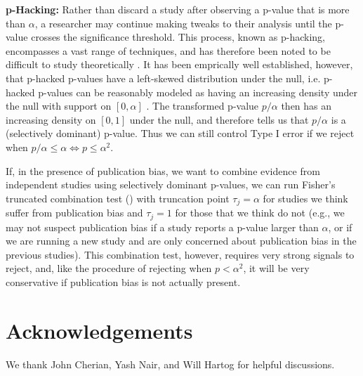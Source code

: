 \documentclass{article}
\begin{document}
\noindent \textbf{p-Hacking: } Rather than discard a study after observing a p-value that is more than $\alpha$, a researcher may continue making tweaks to their analysis until the p-value crosses the significance threshold. This process, known as p-hacking, encompasses a vast range of techniques, and has therefore been noted to be difficult to study theoretically \citep{Hung2020}. It has been emprically well established, however, that p-hacked p-values have a left-skewed distribution under the null, i.e. p-hacked p-values can be reasonably modeled as having an increasing density under the null with support on $[0,\alpha]$ \citep{Simonsohn, Hung2020}. The transformed p-value $p/\alpha$ then has an increasing density on $[0, 1]$ under the null, and  therefore tells us that $p/\alpha$ is a (selectively dominant) p-value. Thus we can still control Type I error if we reject when $p/\alpha \leq \alpha \iff p \leq \alpha^2$. \newline  

If, in the presence of publication bias, we want to combine evidence from independent studies using selectively dominant p-values, we can run Fisher's truncated combination test () with truncation point $\tau_j = \alpha$ for studies we think suffer from publication bias and $\tau_j = 1$ for those that we think do not (e.g., we may not suspect publication bias if a study reports a p-value larger than $\alpha$, or if we are running a new study and are only concerned about publication bias in the previous studies). This combination test, however, requires very strong signals to reject, and, like the procedure of rejecting when $p < \alpha^2$, it will be very conservative if publication bias is not actually present. 

\section*{Acknowledgements}
We thank John Cherian, Yash Nair, and Will Hartog for helpful discussions.



\end{document}
